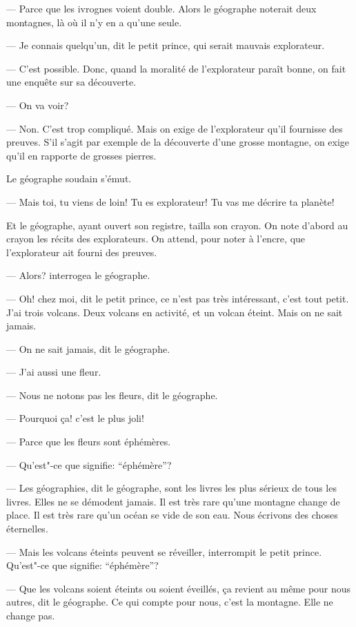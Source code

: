 \begin{Parallel}[p]{}{}
{--- Parce que les ivrognes voient double. Alors le
géographe noterait deux montagnes, là où il n'y en a
qu'une seule.

--- Je connais quelqu'un, dit le petit prince, qui
serait mauvais explorateur.

--- C'est possible. Donc, quand la moralité de
l'explorateur paraît bonne, on fait une enquête sur
sa découverte.

--- On va voir?

--- Non. C'est trop compliqué. Mais on exige de
l'explorateur qu'il fournisse des preuves. S'il s'agit
par exemple de la découverte d'une grosse montagne, on exige qu'il en rapporte de grosses
pierres.

Le géographe soudain s'émut.

--- Mais toi, tu viens de loin! Tu es explorateur! Tu
vas me décrire ta planète!

Et le géographe, ayant ouvert son registre, tailla
son crayon. On note d'abord au crayon les récits des
explorateurs. On attend, pour noter à l'encre, que
l'explorateur ait fourni des preuves.

--- Alors? interrogea le géographe.

--- Oh! chez moi, dit le petit prince, ce n'est pas
très intéressant, c'est tout petit. J'ai trois volcans.
Deux volcans en activité, et un volcan éteint. Mais
on ne sait jamais.

--- On ne sait jamais, dit le géographe.

--- J'ai aussi une fleur.

--- Nous ne notons pas les fleurs, dit le géographe.

--- Pourquoi ça! c'est le plus joli!

--- Parce que les fleurs sont éphémères.

--- Qu'est"-ce que signifie: ``éphémère''?

--- Les géographies, dit le géographe, sont les
livres les plus sérieux de tous les livres. Elles ne se
démodent jamais. Il est très rare qu'une montagne
change de place. Il est très rare qu'un océan se vide
de son eau. Nous écrivons des choses éternelles.

--- Mais les volcans éteints peuvent se réveiller,
interrompit le petit prince. Qu'est"-ce que signifie:
``éphémère''?

--- Que les volcans soient éteints ou soient
éveillés, ça revient au même pour nous autres, dit le
géographe. Ce qui compte pour nous, c'est la montagne. Elle ne change pas.

}
\end{Parallel}
